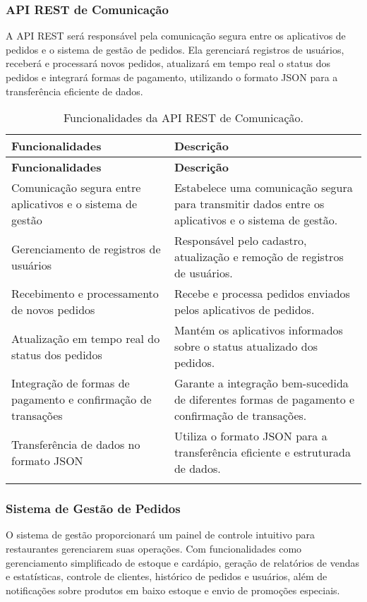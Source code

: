 \subsubsection*{API REST de Comunicação}
A API REST será responsável pela comunicação segura entre os aplicativos de pedidos e o sistema de gestão de pedidos. Ela gerenciará registros de usuários, receberá e processará novos pedidos, atualizará em tempo real o status dos pedidos e integrará formas de pagamento, utilizando o formato JSON para a transferência eficiente de dados.

\begin{center}
    

\begin{longtable}{|p{4cm}|p{11cm}|}
\hline
\textbf{Funcionalidades} & \textbf{Descrição} \\
\hline
\endfirsthead

\hline
\textbf{Funcionalidades} & \textbf{Descrição} \\
\hline
\endhead

Comunicação segura entre aplicativos e o sistema de gestão & Estabelece uma comunicação segura para transmitir dados entre os aplicativos e o sistema de gestão. \\
\hline
Gerenciamento de registros de usuários & Responsável pelo cadastro, atualização e remoção de registros de usuários. \\
\hline
Recebimento e processamento de novos pedidos & Recebe e processa pedidos enviados pelos aplicativos de pedidos. \\
\hline
Atualização em tempo real do status dos pedidos & Mantém os aplicativos informados sobre o status atualizado dos pedidos. \\
\hline
Integração de formas de pagamento e confirmação de transações & Garante a integração bem-sucedida de diferentes formas de pagamento e confirmação de transações. \\
\hline
Transferência de dados no formato JSON & Utiliza o formato JSON para a transferência eficiente e estruturada de dados. \\
\hline
\caption{Funcionalidades da API REST de Comunicação.}
\label{tab:api_rest}
\end{longtable}
\end{center}

\subsubsection*{Sistema de Gestão de Pedidos}
O sistema de gestão proporcionará um painel de controle intuitivo para restaurantes gerenciarem suas operações. Com funcionalidades como gerenciamento simplificado de estoque e cardápio, geração de relatórios de vendas e estatísticas, controle de clientes, histórico de pedidos e usuários, além de notificações sobre produtos em baixo estoque e envio de promoções especiais.

